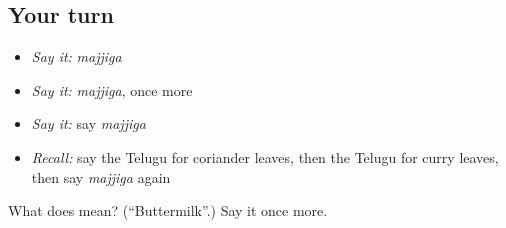 \subsection*{Your turn}
\begin{itemize}
\raggedright
  \item \emph{Say it:} \emph{majjiga}
  \item \emph{Say it:} \emph{majjiga}, once more
  \item \emph{Say it:} say \emph{majjiga}
  \item \emph{Recall:} say the Telugu for coriander leaves, then the Telugu for curry leaves, then say \emph{majjiga} again
\end{itemize}

\begin{tcolorbox}[breakable,colback=teal!4,colframe=teal!35!black,title={Before you move on}]
What does  mean? (\textquotedblleft{}Buttermilk\textquotedblright{}.) Say it once more.
\end{tcolorbox}

